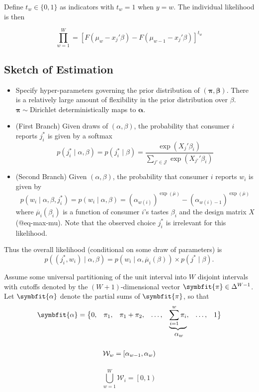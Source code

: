 \documentclass[
]{article}
\begin{document}
Define \(t_w \in \lbrace 0,1 \rbrace\) as indicators with \(t_w=1\) when
\(y=w\). The individual likelihood is then

\[
\prod_{w=1}^W =  \left[ F(\mu_w - x_j'\beta) - F(\mu_{w-1} - x_j'\beta) \right]^{t_w}
\]

\subsection{Sketch of Estimation}\label{sketch-of-estimation}

\begin{itemize}
    \item Specify hyper-parameters governing the prior distribution of $\left(\symbf{\pi}, \symbf{\beta}\right)$. There is a relatively large amount of flexibility in the prior distribution over $\beta$. $\symbf{\pi} \sim \text{Dirichlet}$ deterministically maps to $\symbf{\alpha}$.
    \item (First Branch) Given draws of $\left(\alpha, \beta\right)$, the probability that consumer $i$ reports $j^*_i$ is given by a softmax
        $$
        p\left(j^*_i \mid \alpha, \beta\right) = p\left(j^*_i \mid \beta\right) = \frac{\exp\left({X_j}'\beta_i\right)}{\sum_{j'\in\mathcal{J}}\exp\left({X_{j'}}'\beta_i\right)}
        $$
    \item (Second Branch) Given $\left(\alpha, \beta\right)$, the probability that consumer $i$ reports $w_i$ is given by
    $$
        p\left(w_i \mid \alpha,\beta, j^*_i\right) = p\left(w_i\mid \alpha, \beta\right) =  \left({\alpha_{w\left(i\right)}}\right)^{\exp\left(\overline{\mu}\right)} - \left({\alpha_{w\left(i\right)-1}}\right)^{\exp\left(\overline{\mu}\right)}
    $$
    where $\overline{\mu}_i\left(\beta_i\right)$ is a function of consumer $i$'s tastes $\beta_i$ and the design matrix $X$ (@eq-max-mu). Note that the observed choice $j^*_i$ is irrelevant for this likelihood.
\end{itemize}

Thus the overall likelihood (conditional on some draw of parameters) is
\[
    p\left(\left(j^*_i, w_i\right) \mid \alpha, \beta \right) = p\left(w_i \mid \alpha,\overline{\mu}_i\left(\beta\right) \right) \times p\left(j^* \mid \beta\right).
\]

Assume some universal partitioning of the unit interval into \(W\)
disjoint intervals with cutoffs denoted by the
\(\left(W+1\right)\)-dimensional vector
\(\symbfit{\pi} \in \Delta^{W-1}\). Let \(\symbfit{\alpha}\) denote the
partial sums of \(\symbfit{\pi}\), so that \[
    \begin{array}{*9{c}}
       \symbfit{\alpha}  = \big\lbrace 0, & \pi_1, & \pi_1 + \pi_2, & \ldots, & \underbrace{\sum_{i=1}^{w} \pi_{i}}, & \ldots, & 1\big\rbrace \\
         & & & & \alpha_w 
    \end{array}
\] \[
    \vphantom{\bigcup_{w=1}^W} \mathcal{W}_w = \left[\alpha_{w-1}, \alpha_w\right)
\] \[
    \bigcup_{w=1}^W \mathcal{W}_i = \left[0, 1\right)
\]
\end{document}

